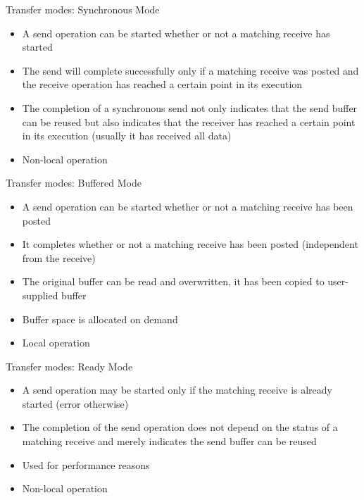 \documentclass[aspectratio=43]{beamer}
\begin{document}
\begin{frame}{Transfer modes: Synchronous Mode}
\begin{itemize}
\item A send operation can be started whether or not a matching receive has started
\item The send will complete successfully only if a matching receive was posted and the receive operation has reached a certain point in its execution
\item The completion of a synchronous send not only indicates that the send buffer can be reused but also indicates that the receiver has reached a certain point in its execution (usually it has received all data)
\item Non-local operation
\end{itemize}
\end{frame}

\begin{frame}[fragile]{Transfer modes: Buffered Mode}
\begin{itemize}
\item A send operation can be started whether or not a matching receive has been posted
\item It completes whether or not a matching receive has been posted (independent from the receive)
\item The original buffer can be read and overwritten, it has been copied to user-supplied buffer
\item Buffer space is allocated on demand 
\item Local operation
\end{itemize}
\end{frame}

\begin{frame}{Transfer modes: Ready Mode}
\begin{itemize}
    \item A send operation may be started only if the matching receive is already started (error otherwise)
\item The completion of the send operation does not depend on the status of a matching receive and merely indicates the send buffer can be reused
\item Used for performance reasons
\item Non-local operation
\end{itemize}
\end{frame}
\end{document}
